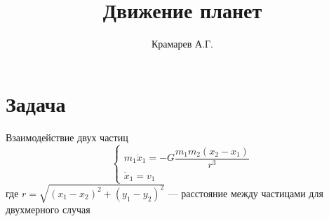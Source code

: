 
\title{Движение планет}
\author{Крамарев А.Г.}

\maketitle %

\section{Задача}

Взаимодействие двух частиц
\begin{equation}
\begin{cases}
m_1 \ddot{x}_1 = - G \dfrac{ m_1 m_2 (x_2 - x_1) }{r^3} \\ 
\dot{x}_1 = v_1
\end{cases}
\end{equation}
где $r = \sqrt{(x_1 - x_2)^2 + (y_1 - y_2)^2}$ --- расстояние между частицами для двухмерного случая 


